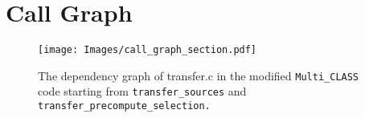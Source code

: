 \chapter{Call Graph}
\vspace{-4cm}
\begin{figure}[H]
    \centering
    \texttt{[image: Images/call\_graph\_section.pdf]}
    \caption{The dependency graph of transfer.c in the modified {\tt Multi\_CLASS} code starting from {\tt transfer\_sources} and {\tt transfer\_precompute\_selection.}} 
    \label{call_graph}
\end{figure} 
\newpage
{}
\listoffigures
